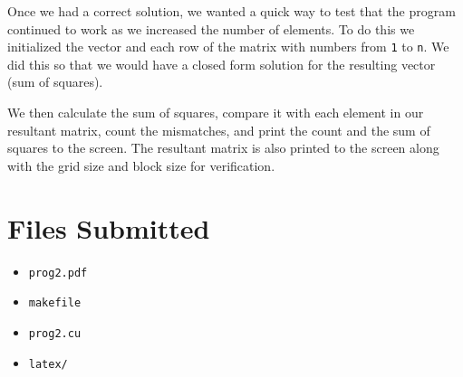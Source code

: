 \documentclass{article}
\begin{document}
\medskip
\noindent
Once we had a correct solution, we wanted a quick way to test that the program 
continued to work as we increased the number of elements. To do this we 
initialized the vector and each row of the matrix with numbers from \texttt{1} 
to \texttt{n}. We did this so that we would have a closed form solution for the 
resulting vector (sum of squares).

\noindent
We then calculate the sum of squares, compare it with each element in our 
resultant matrix, count the mismatches, and print the count and the sum of 
squares to the screen. The resultant matrix is also printed to the screen along 
with the grid size and block size for verification.

\section{Files Submitted}
\begin{itemize}
    \item \texttt{prog2.pdf}
    \item \texttt{makefile}
    \item \texttt{prog2.cu}
    \item \texttt{latex/}
\end{itemize}
\end{document}
